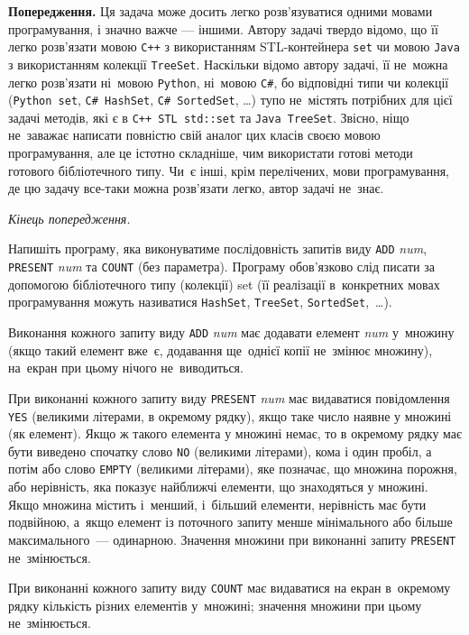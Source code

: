 ﻿{\bf Попередження.} Ця задача може досить легко розв'язуватися одними мовами програмування, і значно важче --- іншими. Автору задачі твердо відомо, що її легко розв'язати мовою {\tt C++} з використанням STL-контейнера {\tt set} чи мовою {\tt Java} з використанням колекції {\tt TreeSet}. Наскільки відомо автору задачі, її не~можна легко розв'язати ні~мовою {\tt Python}, ні~мовою {\tt C\#}, бо відповідні типи чи колекції ({\tt Python set}, {\tt C\# HashSet}, {\tt C\# SortedSet}, \dots) тупо не~містять потрібних для цієї задачі методів, які є в {\tt C++ STL std::set} та {\tt Java TreeSet}. Звісно, ніщо не~заважає написати повністю свій аналог цих класів своєю мовою програмування, але це істотно складніше, чим використати готові методи готового бібліотечного типу. Чи~є інші, крім перелічених, мови програмування, де цю задачу все-таки можна розв'язати легко, автор задачі не~знає.

{\it Кінець попередження.}

Напишіть програму, яка виконуватиме послідовність запитів виду {\tt ADD} {\it num}, {\tt PRESENT} {\it num} та {\tt COUNT} (без параметра). Програму обов'язково слід писати за допомогою бібліотечного типу (колекції) set (її реалізації в~конкретних мовах програмування можуть називатися {\tt HashSet}, {\tt TreeSet}, {\tt SortedSet},~\dots).

Виконання кожного запиту виду {\tt ADD} {\it num} має додавати елемент {\it num} у~множину (якщо такий елемент вже~є, додавання ще~однієї копії не~змінює множину), на~екран при цьому нічого не~виводиться.

При виконанні кожного запиту виду {\tt PRESENT} {\it num} має видаватися повідомлення {\tt YES} (великими літерами, в окремому рядку), якщо таке число наявне у множині (як елемент). Якщо ж такого елемента у множині немає, то в окремому рядку має бути виведено спочатку слово {\tt NO} (великими літерами), кома і один пробіл, а потім або слово {\tt EMPTY} (великими літерами), яке позначає, що множина порожня, або нерівність, яка показує найближчі елементи, що знаходяться у множині. Якщо множина містить і~менший, і~більший елементи, нерівність має бути подвійною, а~якщо елемент із поточного запиту менше мінімального або більше максимального~--- одинарною. Значення множини при виконанні запиту {\tt PRESENT} не~змінюється.

При виконанні кожного запиту виду {\tt COUNT} має видаватися на екран в~окремому рядку кількість різних елементів у~множині; значення множини при цьому не~змінюється.


